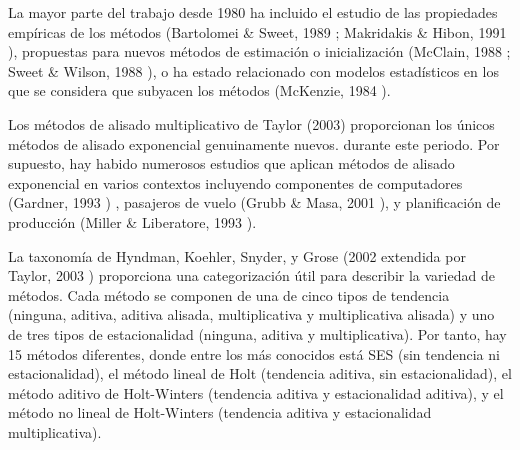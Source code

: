 \documentclass{llncs}
\begin{document}
La mayor parte del trabajo desde 1980 ha incluido el estudio de las propiedades empíricas de los métodos (Bartolomei \& Sweet, 1989 \cite{Bartolomei1989111};  Makridakis \& Hibon, 1991 \cite{Makridakis1991317}), propuestas para nuevos métodos de estimación o inicialización (McClain, 1988 \cite{McClain1988563}; Sweet \& Wilson, 1988 \cite{Sweet1988573}), o ha estado relacionado con modelos estadísticos en los que se considera que subyacen los métodos (McKenzie, 1984 \cite{McKenzie1984333}). 

Los métodos de alisado multiplicativo de Taylor (2003)\cite{Taylor2003715} proporcionan los únicos métodos de alisado exponencial genuinamente nuevos. durante este periodo. Por supuesto, hay habido numerosos estudios que aplican métodos de alisado exponencial en varios contextos incluyendo componentes de computadores (Gardner, 1993 \cite{GardnerJr1993245}) , pasajeros de vuelo (Grubb \& Masa, 2001 \cite{Grubb200171}), y planificación de producción (Miller \& Liberatore, 1993 \cite{Miller1993509}).

La taxonomía de Hyndman, Koehler, Snyder, y Grose (2002 \cite{Hyndman2002439} extendida por Taylor, 2003 \cite{Taylor2003715}) proporciona una categorización útil para describir la variedad de métodos. Cada método se componen de una de cinco tipos de tendencia (ninguna, aditiva, aditiva alisada, multiplicativa y multiplicativa alisada) y uno de tres tipos de estacionalidad (ninguna, aditiva y multiplicativa). Por tanto, hay 15 métodos diferentes, donde entre los más conocidos está SES (sin tendencia ni estacionalidad), el método lineal de Holt (tendencia aditiva, sin estacionalidad), el método aditivo de Holt-Winters (tendencia aditiva y estacionalidad aditiva), y el método no lineal de Holt-Winters (tendencia aditiva y estacionalidad multiplicativa).
\end{document}
